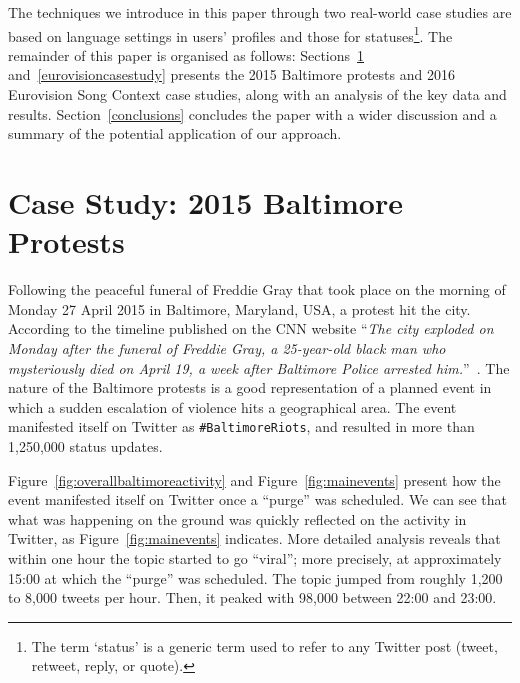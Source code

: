 The techniques we introduce in this paper through two real-world case
studies are based on language settings in users' profiles and those
for statuses\footnote{The term `status' is a generic term used to
refer to any Twitter post (tweet, retweet, reply, or quote).}. The
remainder of this paper is organised as follows:
Sections~\ref{baltimorecasestudy} and~\ref{eurovisioncasestudy}
presents the 2015 Baltimore protests and 2016 Eurovision Song Context
case studies, along with an analysis of the key data and
results. Section~\ref{conclusions} concludes the paper with a wider
discussion and a summary of the potential application of our approach.


\section{Case Study: 2015 Baltimore Protests}\label{baltimorecasestudy}

Following the peaceful funeral of Freddie Gray that took place on the
morning of Monday 27 April 2015 in Baltimore, Maryland, USA, a protest
hit the city. According to the timeline published on the CNN website
``{\emph{The city exploded on Monday after the funeral of Freddie
Gray, a 25-year-old black man who mysteriously died on April 19, a
week after Baltimore Police arrested
him.}}''~\cite{baltimorewiki:2015}. The nature of the Baltimore protests
is a good representation of a planned event in which a sudden
escalation of violence hits a geographical area. The event manifested
itself on Twitter as {\texttt{\#BaltimoreRiots}}, and resulted in more
than 1,250,000 status updates.

Figure~\ref{fig:overallbaltimoreactivity} and Figure~\ref{fig:mainevents}
present how the event manifested itself on Twitter once a ``purge'' was
scheduled. We can see that what was happening on the ground was
quickly reflected on the activity in Twitter, as
Figure~\ref{fig:mainevents} indicates. More detailed analysis reveals
that within one hour the topic started to go ``viral''; more
precisely, at approximately 15:00 at which the ``purge'' was
scheduled. The topic jumped from roughly 1,200 to 8,000 tweets per
hour. Then, it peaked with 98,000 between 22:00 and 23:00.

